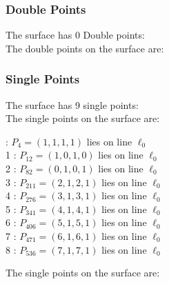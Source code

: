\documentclass{article}
\begin{document}
{\subsubsection*{Double Points}
The surface has 0 Double points:\\
The double points on the surface are:\\
\begin{multicols}{2}
\noindent
\end{multicols}
\subsubsection*{Single Points}
The surface has 9 single points:\\
The single points on the surface are:\\
\begin{multicols}{2}
 : $P_{4}=( 1, 1, 1, 1 )$ lies on line $\ell_{0}$\\
1 : $P_{12}=( 1, 0, 1, 0 )$ lies on line $\ell_{0}$\\
2 : $P_{82}=( 0, 1, 0, 1 )$ lies on line $\ell_{0}$\\
3 : $P_{211}=( 2, 1, 2, 1 )$ lies on line $\ell_{0}$\\
4 : $P_{276}=( 3, 1, 3, 1 )$ lies on line $\ell_{0}$\\
5 : $P_{341}=( 4, 1, 4, 1 )$ lies on line $\ell_{0}$\\
6 : $P_{406}=( 5, 1, 5, 1 )$ lies on line $\ell_{0}$\\
7 : $P_{471}=( 6, 1, 6, 1 )$ lies on line $\ell_{0}$\\
8 : $P_{536}=( 7, 1, 7, 1 )$ lies on line $\ell_{0}$\\
\end{multicols}
The single points on the surface are:\\
}
\end{document}
